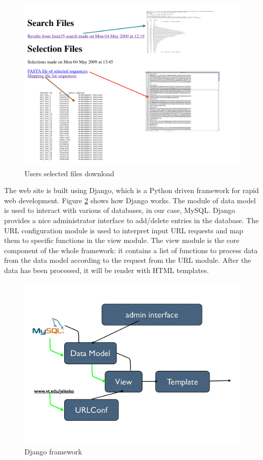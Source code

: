 \documentclass[11pt,letterpaper,twoside,english]{article}
\begin{document}
%
\begin{figure}[h]
\begin{centering}
\includegraphics[width=0.8\linewidth]{figures/User_selection}
\par\end{centering}

\caption{\label{fig:Users-selected-files}Users selected files download}

\end{figure}


The web site is built using Django, which is a Python driven framework
for rapid web development. Figure \ref{fig:Django-framework} shows
how Django works. The module of data model is used to interact with
various of databases, in our case, MySQL. Django provides a nice administrator
interface to add/delete entries in the database. The URL configuration
module is used to interpret input URL requests and map them to specific
functions in the view module. The view module is the core component
of the whole framework: it contains a list of functions to process
data from the data model according to the request from the URL module.
After the data has been processed, it will be render with HTML templates.

%
\begin{figure}[h]
\begin{centering}
\includegraphics[width=0.6\linewidth]{figures/Django}
\par\end{centering}

\caption{\label{fig:Django-framework}Django framework}

\end{figure}
\end{document}
